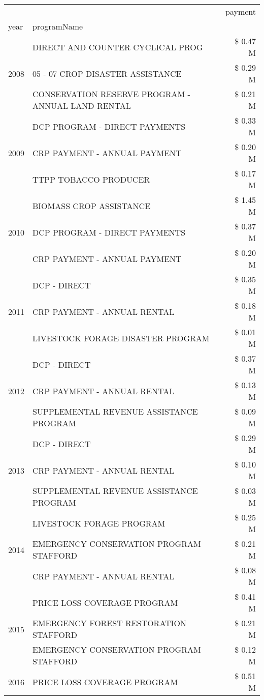 \begin{tabular}{llr}
\toprule
 &  & payment \\
year & programName &  \\
\midrule
\multirow[t]{3}{*}{2008} & DIRECT AND COUNTER CYCLICAL PROG & \$ 0.47 M \\
 & 05 - 07 CROP DISASTER ASSISTANCE & \$ 0.29 M \\
 & CONSERVATION RESERVE PROGRAM - ANNUAL LAND RENTAL & \$ 0.21 M \\
\cline{1-3}
\multirow[t]{3}{*}{2009} & DCP PROGRAM - DIRECT PAYMENTS & \$ 0.33 M \\
 & CRP PAYMENT - ANNUAL PAYMENT & \$ 0.20 M \\
 & TTPP TOBACCO PRODUCER & \$ 0.17 M \\
\cline{1-3}
\multirow[t]{3}{*}{2010} & BIOMASS CROP ASSISTANCE & \$ 1.45 M \\
 & DCP PROGRAM - DIRECT PAYMENTS & \$ 0.37 M \\
 & CRP PAYMENT - ANNUAL PAYMENT & \$ 0.20 M \\
\cline{1-3}
\multirow[t]{3}{*}{2011} & DCP - DIRECT & \$ 0.35 M \\
 & CRP PAYMENT - ANNUAL RENTAL & \$ 0.18 M \\
 & LIVESTOCK FORAGE DISASTER PROGRAM & \$ 0.01 M \\
\cline{1-3}
\multirow[t]{3}{*}{2012} & DCP - DIRECT & \$ 0.37 M \\
 & CRP PAYMENT - ANNUAL RENTAL & \$ 0.13 M \\
 & SUPPLEMENTAL REVENUE ASSISTANCE PROGRAM & \$ 0.09 M \\
\cline{1-3}
\multirow[t]{3}{*}{2013} & DCP - DIRECT & \$ 0.29 M \\
 & CRP PAYMENT - ANNUAL RENTAL & \$ 0.10 M \\
 & SUPPLEMENTAL REVENUE ASSISTANCE PROGRAM & \$ 0.03 M \\
\cline{1-3}
\multirow[t]{3}{*}{2014} & LIVESTOCK FORAGE PROGRAM & \$ 0.25 M \\
 & EMERGENCY CONSERVATION PROGRAM STAFFORD & \$ 0.21 M \\
 & CRP PAYMENT - ANNUAL RENTAL & \$ 0.08 M \\
\cline{1-3}
\multirow[t]{3}{*}{2015} & PRICE LOSS COVERAGE PROGRAM & \$ 0.41 M \\
 & EMERGENCY FOREST RESTORATION STAFFORD & \$ 0.21 M \\
 & EMERGENCY CONSERVATION PROGRAM STAFFORD & \$ 0.12 M \\
\cline{1-3}
\multirow[t]{3}{*}{2016} & PRICE LOSS COVERAGE PROGRAM & \$ 0.51 M \\

\end{tabular}

